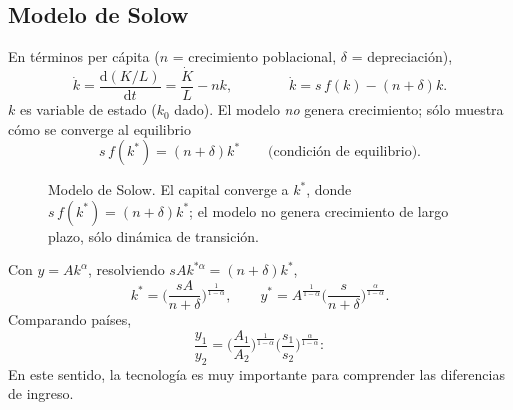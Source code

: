\documentclass[11pt]{article}
\theoremstyle{definition}
\begin{document}
\subsection{Modelo de Solow}

En términos per cápita ($n$ = crecimiento poblacional, $\delta$ = depreciación),
\begin{equation}
\dot{k}=\frac{\mathrm{d}(K/L)}{\mathrm{d}t}=\frac{\dot{K}}{L}-nk,
\qquad\qquad
\dot{k}=s\,f(k)-(n+\delta)k .
\end{equation}
$k$ es variable de estado ($k_{0}$ dado). El modelo \emph{no} genera crecimiento; sólo muestra cómo
se converge al equilibrio
\begin{equation}
s\,f(k^{\ast})=(n+\delta)k^{\ast}\qquad\text{(condición de equilibrio).}
\end{equation}

\begin{figure}[h]
\centering
{}
\caption{Modelo de Solow. El capital converge a $k^{\ast}$, donde $s\,f(k^{\ast})=(n+\delta)k^{\ast}$;
el modelo no genera crecimiento de largo plazo, sólo dinámica de transición.}
\end{figure}

Con $y=Ak^{\alpha}$, resolviendo $sAk^{\ast\alpha}=(n+\delta)k^{\ast}$,
\begin{equation}
k^{\ast}=\Big(\frac{sA}{n+\delta}\Big)^{\frac{1}{1-\alpha}},
\qquad
y^{\ast}=A^{\frac{1}{1-\alpha}}\Big(\frac{s}{n+\delta}\Big)^{\frac{\alpha}{1-\alpha}} .
\end{equation}
Comparando países,
\begin{equation}
\frac{y_{1}}{y_{2}}=\Big(\frac{A_{1}}{A_{2}}\Big)^{\frac{1}{1-\alpha}}\Big(\frac{s_{1}}{s_{2}}\Big)^{\frac{\alpha}{1-\alpha}} :
\end{equation}
En este sentido, la tecnología es muy importante para comprender las diferencias de ingreso.
\end{document}
